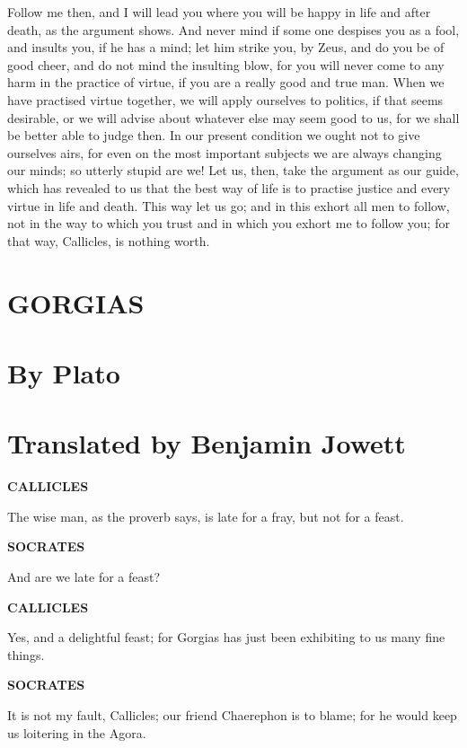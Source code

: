 \documentclass[11pt,letter]{article}
\begin{document}
\par  Follow me then, and I will lead you where you will be happy in life and after death, as the argument shows. And never mind if some one despises you as a fool, and insults you, if he has a mind; let him strike you, by Zeus, and do you be of good cheer, and do not mind the insulting blow, for you will never come to any harm in the practice of virtue, if you are a really good and true man. When we have practised virtue together, we will apply ourselves to politics, if that seems desirable, or we will advise about whatever else may seem good to us, for we shall be better able to judge then. In our present condition we ought not to give ourselves airs, for even on the most important subjects we are always changing our minds; so utterly stupid are we! Let us, then, take the argument as our guide, which has revealed to us that the best way of life is to practise justice and every virtue in life and death. This way let us go; and in this exhort all men to follow, not in the way to which you trust and in which you exhort me to follow you; for that way, Callicles, is nothing worth.
\section{GORGIAS}\section{By Plato}\section{Translated by Benjamin Jowett}  
\par \textbf{CALLICLES}
\par   The wise man, as the proverb says, is late for a fray, but not for a feast.

\par \textbf{SOCRATES}
\par   And are we late for a feast?

\par \textbf{CALLICLES}
\par   Yes, and a delightful feast; for Gorgias has just been exhibiting to us many fine things.

\par \textbf{SOCRATES}
\par   It is not my fault, Callicles; our friend Chaerephon is to blame; for he would keep us loitering in the Agora.
\end{document}
